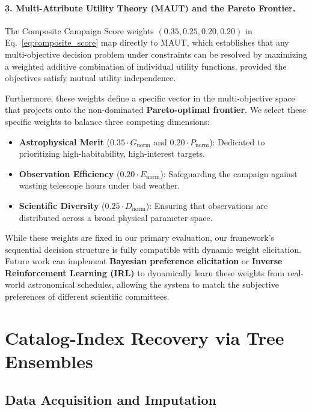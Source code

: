 \documentclass[11pt,a4paper]{article}
\begin{document}
\paragraph{3. Multi-Attribute Utility Theory (MAUT) and the Pareto Frontier.}
The Composite Campaign Score weights $(0.35, 0.25, 0.20, 0.20)$ in Eq.~\ref{eq:composite_score} map directly to MAUT, which establishes that any multi-objective decision problem under constraints can be resolved by maximizing a weighted additive combination of individual utility functions, provided the objectives satisfy mutual utility independence.

Furthermore, these weights define a specific vector in the multi-objective space that projects onto the non-dominated \textbf{Pareto-optimal frontier}. We select these specific weights to balance three competing dimensions:
\begin{itemize}
    \item \textbf{Astrophysical Merit} ($0.35 \cdot G_{\text{norm}}$ and $0.20 \cdot P_{\text{norm}}$): Dedicated to prioritizing high-habitability, high-interest targets.
    \item \textbf{Observation Efficiency} ($0.20 \cdot E_{\text{norm}}$): Safeguarding the campaign against wasting telescope hours under bad weather.
    \item \textbf{Scientific Diversity} ($0.25 \cdot D_{\text{norm}}$): Ensuring that observations are distributed across a broad physical parameter space.
\end{itemize}
While these weights are fixed in our primary evaluation, our framework's sequential decision structure is fully compatible with dynamic weight elicitation. Future work can implement \textbf{Bayesian preference elicitation} or \textbf{Inverse Reinforcement Learning (IRL)} to dynamically learn these weights from real-world astronomical schedules, allowing the system to match the subjective preferences of different scientific committees.

\section{Catalog-Index Recovery via Tree Ensembles}
\label{sec:ml}

\subsection{Data Acquisition and Imputation}
\end{document}
